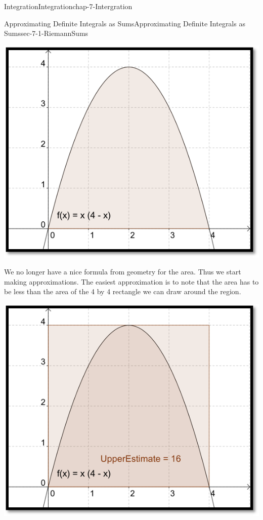 \documentclass[oneside,10pt,]{book}
\numberwithin{equation}{section}
\begin{document}
\begin{chapterptx}{Integration}{}{Integration}{}{}{chap-7-Intergration}
\begin{sectionptx}{Approximating Definite Integrals as Sums}{}{Approximating Definite Integrals as Sums}{}{}{sec-7-1-RiemannSums}
\begin{sidebyside}{1}{0.2}{0.2}{0}
\begin{sbspanel}{0.6}%
\includegraphics[width=1\linewidth]{images/sec7-1-2.png}
\end{sbspanel}%
\end{sidebyside}%
\par
\hypertarget{p-2550}{}%
We no longer have a nice formula from geometry for the area.  Thus we start making approximations.  The easiest approximation is to note that the area has to be less than the area of the 4 by 4 rectangle we can draw around the region.%
\begin{sidebyside}{1}{0.2}{0.2}{0}%
\begin{sbspanel}{0.6}%
\includegraphics[width=1\linewidth]{images/sec7-1-3.png}

\end{sbspanel}
\end{sidebyside}
\end{sectionptx}
\end{chapterptx}
\end{document}
